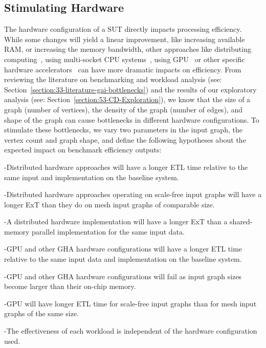\subsection{Stimulating Hardware}
The hardware configuration of a \ac{SUT} directly impacts processing efficiency. 
While some changes will yield a linear improvement, like increasing available \ac{RAM}, or increasing the memory bandwidth, other approaches like distributing computing~\cite{Beamer2015}, using multi-socket \ac{CPU} systems~\cite{Dhulipala2021}, using \ac{GPU}~\cite{Wang2016} or other specific hardware accelerators~\cite{Aananthakrishnan2020} can have more dramatic impacts on efficiency. 
From reviewing the literature on \gai benchmarking and workload analysis (see: Section~\ref{section:33-literature-gai-bottlenecks}) and the results of our exploratory analysis (see: Section~\ref{section:53-CD-Exploration}), we know that the size of a graph (number of vertices), the density of the graph (number of edges), and shape of the graph can cause bottlenecks in different hardware configurations. 
To stimulate these bottlenecks, we vary two parameters in the input graph, the vertex count and graph shape, and define the following hypotheses about the expected impact on benchmark efficiency outputs: 

\hyp{Distributed hardware approaches will have a longer \ac{ETL} time relative to the same input and implementation on the baseline system.}

\hyp{Distributed hardware approaches operating on scale-free input graphs will have a longer \ac{ExT} than they do on mesh input graphs of comparable size.}

\hyp{A distributed hardware implementation will have a longer \ac{ExT} than a shared-memory parallel implementation for the same input data.}

\hyp{\ac{GPU} and other \ac{GHA} hardware configurations will have a longer \ac{ETL} time relative to the same input data and implementation on the baseline system.}

\hyp{\ac{GPU} and other \ac{GHA} hardware configurations will fail as input graph sizes become larger than their on-chip memory.}

\hyp{\ac{GPU} will have longer \ac{ETL} time for scale-free input graphs than for mesh input graphs of the same size.}

\hyp{The effectiveness of each workload is independent of the hardware configuration used.}

